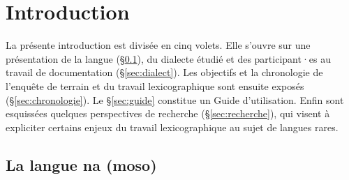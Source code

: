 
\languefra

\chapter*{Introduction}

La présente introduction est divisée en cinq volets. Elle s'ouvre sur une présentation de la langue (§\ref{sec:lang}), du dialecte étudié et des participant·es au travail de documentation (§\ref{sec:dialect}). Les objectifs et la chronologie de l'enquête de terrain et du travail lexicographique sont ensuite exposés (§\ref{sec:chronologie}). Le §\ref{sec:guide} constitue un Guide d'utilisation. Enfin sont esquissées quelques perspectives de recherche (§\ref{sec:recherche}), qui visent à expliciter certains enjeux du travail lexicographique au sujet de langues rares.


\section{La langue na (moso)}
\label{sec:lang}


